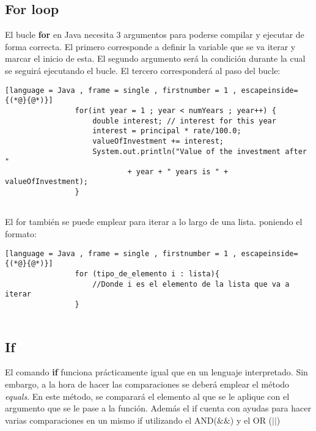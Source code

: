 \documentclass[11pt]{article}
\theoremstyle{plain}
\begin{document}
        \subsection{For loop} %
        \label{sub:for_loop}
            El bucle \textbf{for} en Java necesita 3 argumentos para poderse compilar y ejecutar de forma correcta. El primero corresponde a definir la variable que se va iterar y marcar el inicio de esta. El segundo argumento será la condición durante la cual se seguirá ejecutando el bucle. El tercero corresponderá al paso del bucle:
            \begin{lstlisting}[language = Java , frame = single , firstnumber = 1 , escapeinside={(*@}{@*)}]
                for(int year = 1 ; year < numYears ; year++) {
                    double interest; // interest for this year
                    interest = principal * rate/100.0;
                    valueOfInvestment += interest;
                    System.out.println("Value of the investment after "
                            + year + " years is " + valueOfInvestment);
                }
                 
             \end{lstlisting}
             El for también se puede emplear para iterar a lo largo de una lista. poniendo el formato:
            \begin{lstlisting}[language = Java , frame = single , firstnumber = 1 , escapeinside={(*@}{@*)}]
                for (tipo_de_elemento i : lista){
                    //Donde i es el elemento de la lista que va a iterar
                }
                 
             \end{lstlisting}
        \subsection{If} %
        \label{sub:if}
            El comando \textbf{if} funciona prácticamente igual que en un lenguaje interpretado. Sin embargo, a la hora de hacer las comparaciones se deberá emplear el método \textit{equals}. En este método, se comparará el elemento al que se le aplique con el argumento que se le pase a la función. Además el if cuenta con ayudas para hacer varias comparaciones en un mismo if utilizando el AND($\&\&$) y el OR ($||$)
\end{document}
